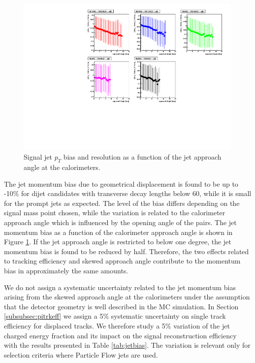 \begin{figure}[htbp]
\centering
\includegraphics[width=0.99\textwidth]{plots/signal/biasapproachAngle.pdf}
\caption{Signal jet $p_T$ bias and resolution as a function of the jet approach angle at the calorimeters.\label{fig:jetbiasAngle}}
\end{figure} 

The jet momentum bias due to geometrical displacement is found to be up to -10\% for dijet candidates with transverse
decay lengths below 60\cm, while it is small for the prompt jets as expected. The level of the bias differs
depending on the signal mass point chosen, while the variation is related to the calorimeter approach angle
which is influenced by the opening angle of the \qq pairs.
The jet momentum bias as a function of the calorimeter approach angle is shown in Figure \ref{fig:jetbiasAngle}.
If the jet approach angle is restricted to below one degree, the jet momentum bias is found to be reduced by half.
 Therefore, the two effects related to tracking efficiency and skewed approach angle contribute to the 
momentum bias in approximately the same amounts.

We do not assign a systematic uncertainty related to the jet momentum bias arising from the skewed approach angle 
at the calorimeters under the assumption that the detector geometry is well described in the MC simulation.
In Section \ref{subsubsec:pitrkeff} we assign a 5\% systematic uncertainty on single track efficiency for 
displaced tracks. We therefore study a 5\% variation of the jet charged energy
fraction and its impact on the signal reconstruction efficiency with the results presented 
in Table \ref{tab:jetbias}. The variation is relevant only for selection criteria where Particle Flow jets
are used. 


